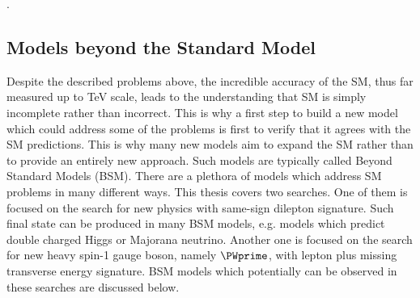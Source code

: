 
.


\subsection{Models beyond the Standard Model}
\label{subsec:bsm_models}
Despite the described problems above, the incredible accuracy of the SM, thus far measured up to TeV scale, leads to the understanding that SM 
is simply incomplete rather than incorrect. 
This is why a first step to build a new model which could address some of the problems is first to verify that it agrees with the SM predictions. 
This is why many new models aim to expand the SM rather than to provide an entirely new approach. Such models are typically called Beyond Standard Models (BSM).
There are a plethora of models which address SM problems in many different ways. 
This thesis covers two searches. One of them is focused on the search for new physics with same-sign dilepton signature. Such final state can be produced in many BSM models, e.g. models which predict double charged Higgs or Majorana neutrino. Another one is focused on the search for new heavy spin-1 gauge boson, namely $\PWprime$, with lepton plus missing transverse energy signature. BSM models which potentially can be observed in these searches are discussed below.

